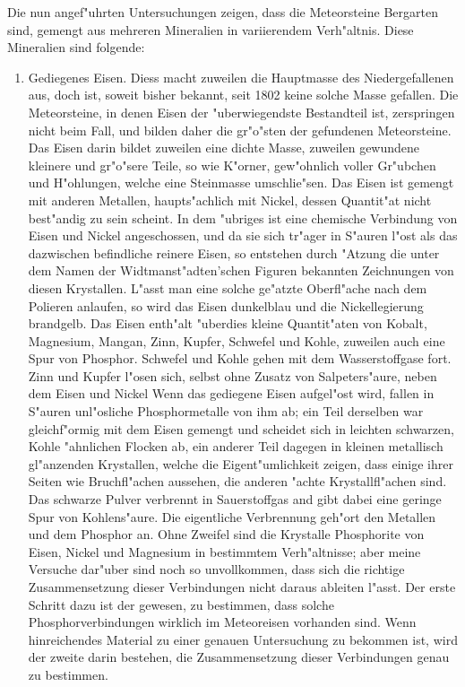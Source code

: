 \documentclass[a4paper, 11pt, oneside]{article}
\begin{document}
Die nun angef"uhrten Untersuchungen zeigen, dass die Meteorsteine Bergarten sind, gemengt aus mehreren Mineralien in variierendem Verh"altnis. Diese Mineralien sind folgende:
\begin{enumerate}
    \item Gediegenes Eisen. Diess macht zuweilen die Hauptmasse des Niedergefallenen aus, doch ist, soweit bisher bekannt, seit 1802 keine solche Masse gefallen. Die Meteorsteine, in denen Eisen der "uberwiegendste Bestandteil ist, zerspringen nicht beim Fall, und bilden daher die gr"o"sten der gefundenen Meteorsteine. Das Eisen darin bildet zuweilen eine dichte Masse, zuweilen gewundene kleinere und gr"o"sere Teile, so wie K"orner, gew"ohnlich voller Gr"ubchen und H"ohlungen, welche eine Steinmasse umschlie"sen. Das Eisen ist gemengt mit anderen Metallen, haupts"achlich mit Nickel, dessen Quantit"at nicht best"andig zu sein scheint. In dem "ubriges ist eine chemische Verbindung von Eisen und Nickel angeschossen, und da sie sich tr"ager in S"auren l"ost als das dazwischen befindliche reinere Eisen, so entstehen durch "Atzung die unter dem Namen der Widtmanst"adten'schen Figuren bekannten Zeichnungen von diesen Krystallen. L"asst man eine solche ge"atzte Oberfl"ache nach dem Polieren anlaufen, so wird das Eisen dunkelblau und die Nickellegierung brandgelb. Das Eisen enth"alt "uberdies kleine Quantit"aten von Kobalt, Magnesium, Mangan, Zinn, Kupfer, Schwefel und Kohle, zuweilen auch eine Spur von Phosphor. Schwefel und Kohle gehen mit dem Wasserstoffgase fort. Zinn und Kupfer l"osen sich, selbst ohne Zusatz von Salpeters"aure, neben dem Eisen und Nickel Wenn das gediegene Eisen aufgel"ost wird, fallen in S"auren unl"osliche Phosphormetalle von ihm ab; ein Teil derselben war gleichf"ormig mit dem Eisen gemengt und scheidet sich in leichten schwarzen, Kohle "ahnlichen Flocken ab, ein anderer Teil dagegen in kleinen metallisch gl"anzenden Krystallen, welche die Eigent"umlichkeit zeigen, dass einige ihrer Seiten wie Bruchfl"achen aussehen, die anderen "achte Krystallfl"achen sind. Das schwarze Pulver verbrennt in Sauerstoffgas and gibt dabei eine geringe Spur von Kohlens"aure. Die eigentliche Verbrennung geh"ort den Metallen und dem Phosphor an. Ohne Zweifel sind die Krystalle Phosphorite von Eisen, Nickel und Magnesium in bestimmtem Verh"altnisse; aber meine Versuche dar"uber sind noch so unvollkommen, dass sich die richtige Zusammensetzung dieser Verbindungen nicht daraus ableiten l"asst. Der erste Schritt dazu ist der gewesen, zu bestimmen, dass solche Phosphorverbindungen wirklich im Meteoreisen vorhanden sind. Wenn hinreichendes Material zu einer genauen Untersuchung zu bekommen ist, wird der zweite darin bestehen, die Zusammensetzung dieser Verbindungen genau zu bestimmen.

\end{enumerate}
\end{document}
